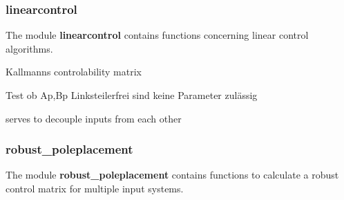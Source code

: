 \documentclass[letterpaper,10pt,english]{sphinxmanual}
\begin{document}
\subsubsection{\textbf{linearcontrol}}
\label{pycontroltools:id4}
The module \textbf{linearcontrol} contains functions concerning
linear control algorithms.
\label{pycontroltools:module-linearcontrol.linearcontrol}\label{pycontroltools:module-linearcontrol}

\begin{fulllineitems}
\label{pycontroltools:linearcontrol.linearcontrol.cont_mat}
Kallmanns controlability matrix

\end{fulllineitems}


\begin{fulllineitems}
\label{pycontroltools:linearcontrol.linearcontrol.is_left_coprime}
Test ob Ap,Bp Linksteilerfrei sind
keine Parameter zulässig

\end{fulllineitems}


\begin{fulllineitems}
\label{pycontroltools:linearcontrol.linearcontrol.linear_input_trafo}
serves to decouple inputs from each other

\end{fulllineitems}



\subsubsection{\textbf{robust\_poleplacement}}
\label{pycontroltools:robust-poleplacement}
The module \textbf{robust\_poleplacement} contains functions to calculate a robust
control matrix for multiple input systems.
\label{pycontroltools:module-linearcontrol.robust_poleplacement}\label{pycontroltools:module-opt_polplatzierung}
\end{document}
